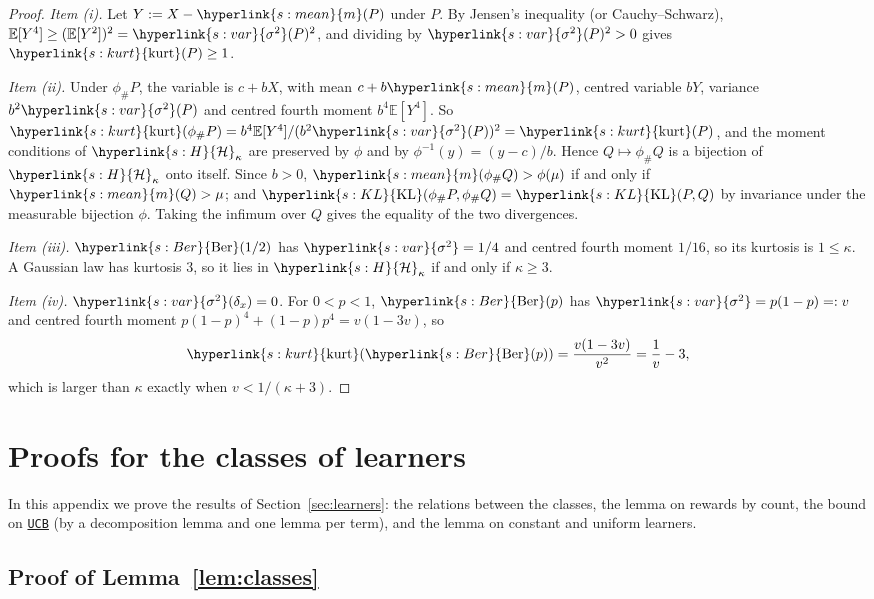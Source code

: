 \documentclass[11pt]{article}
\newcommand{\E}{\mathbb{E}}
\newcommand{\sy}[2]{{\hyperlink{#1}{#2}}}
\newcommand{\mean}{\sy{s:mean}{m}}
\newcommand{\KL}{\sy{s:KL}{\mathrm{KL}}}
\newcommand{\Ber}{\sy{s:Ber}{\mathrm{Ber}}}
\newcommand{\var}{\sy{s:var}{\sigma^{2}}}
\newcommand{\kurt}{\sy{s:kurt}{\mathrm{kurt}}}
\newcommand{\Hk}{\sy{s:H}{\mathcal{H}}}
\newcommand{\ucb}{\hyperref[alg:ucb]{\texttt{UCB}}}
\begin{document}
\begin{proof}
\emph{Item (i).} Let $Y:=X-\mean(P)$ under $P$. By Jensen's inequality (or Cauchy--Schwarz),
$\E[Y^4]\ge(\E[Y^2])^2=\var(P)^2$, and dividing by $\var(P)^2>0$ gives $\kurt(P)\ge1$.

\emph{Item (ii).} Under $\phi_\#P$, the variable is $c+bX$, with mean $c+b\mean(P)$, centred
variable $bY$, variance $b^2\var(P)$ and centred fourth moment $b^4\E[Y^4]$. So
$\kurt(\phi_\#P)=b^4\E[Y^4]/(b^2\var(P))^2=\kurt(P)$, and the moment conditions of $\Hk_\kappa$ are
preserved by $\phi$ and by $\phi^{-1}(y)=(y-c)/b$. Hence $Q\mapsto\phi_\#Q$ is a bijection of
$\Hk_\kappa$ onto itself. Since $b>0$, $\mean(\phi_\#Q)>\phi(\mu)$ if and only if $\mean(Q)>\mu$; and
$\KL(\phi_\#P,\phi_\#Q)=\KL(P,Q)$ by invariance under the measurable bijection $\phi$. Taking the
infimum over $Q$ gives the equality of the two divergences.

\emph{Item (iii).} $\Ber(1/2)$ has $\var=1/4$ and centred fourth moment $1/16$, so its kurtosis is
$1\le\kappa$. A Gaussian law has kurtosis $3$, so it lies in $\Hk_\kappa$ if and only if $\kappa\ge3$.

\emph{Item (iv).} $\var(\delta_x)=0$. For $0<p<1$, $\Ber(p)$ has $\var=p(1-p)=:v$ and centred fourth
moment $p(1-p)^4+(1-p)p^4=v(1-3v)$, so
\begin{equation*}
  \kurt(\Ber(p))=\frac{v(1-3v)}{v^2}=\frac1v-3,
\end{equation*}
which is larger than $\kappa$ exactly when $v<1/(\kappa+3)$.
\end{proof}

\section{Proofs for the classes of learners}\label{sec:proof-learners}

In this appendix we prove the results of Section~\ref{sec:learners}: the relations between the
classes, the lemma on rewards by count, the bound on \ucb{} (by a decomposition lemma and one lemma
per term), and the lemma on constant and uniform learners.

\subsection{Proof of Lemma~\ref{lem:classes}}\label{sec:proof-classes}
\end{document}

